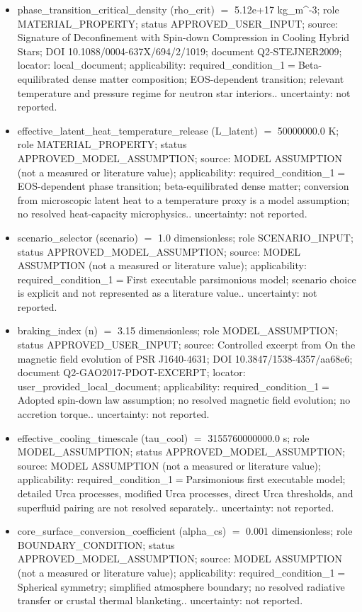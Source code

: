 \documentclass[11pt]{article}
\begin{document}
\begin{itemize}
\item phase\_transition\_critical\_density (rho\_crit) \ensuremath{=} 5.12e+17 kg\_m\textasciicircum{}-3; role MATERIAL\_PROPERTY; status APPROVED\_USER\_INPUT; source: Signature of Deconfinement with Spin-down Compression in Cooling Hybrid Stars; DOI 10.1088/0004-637X/694/2/1019; document Q2-STEJNER2009; locator: local\_document; applicability: required\_condition\_1\ensuremath{=}Beta-equilibrated dense matter composition; EOS-dependent transition; relevant temperature and pressure regime for neutron star interiors.. uncertainty: not reported.
\item effective\_latent\_heat\_temperature\_release (L\_latent) \ensuremath{=} 50000000.0 K; role MATERIAL\_PROPERTY; status APPROVED\_MODEL\_ASSUMPTION; source: MODEL ASSUMPTION (not a measured or literature value); applicability: required\_condition\_1\ensuremath{=}EOS-dependent phase transition; beta-equilibrated dense matter; conversion from microscopic latent heat to a temperature proxy is a model assumption; no resolved heat-capacity microphysics.. uncertainty: not reported.
\item scenario\_selector (scenario) \ensuremath{=} 1.0 dimensionless; role SCENARIO\_INPUT; status APPROVED\_MODEL\_ASSUMPTION; source: MODEL ASSUMPTION (not a measured or literature value); applicability: required\_condition\_1\ensuremath{=}First executable parsimonious model; scenario choice is explicit and not represented as a literature value.. uncertainty: not reported.
\item braking\_index (n) \ensuremath{=} 3.15 dimensionless; role MODEL\_ASSUMPTION; status APPROVED\_USER\_INPUT; source: Controlled excerpt from On the magnetic field evolution of PSR J1640-4631; DOI 10.3847/1538-4357/aa68e6; document Q2-GAO2017-PDOT-EXCERPT; locator: user\_provided\_local\_document; applicability: required\_condition\_1\ensuremath{=}Adopted spin-down law assumption; no resolved magnetic field evolution; no accretion torque.. uncertainty: not reported.
\item effective\_cooling\_timescale (tau\_cool) \ensuremath{=} 3155760000000.0 s; role MODEL\_ASSUMPTION; status APPROVED\_MODEL\_ASSUMPTION; source: MODEL ASSUMPTION (not a measured or literature value); applicability: required\_condition\_1\ensuremath{=}Parsimonious first executable model; detailed Urca processes, modified Urca processes, direct Urca thresholds, and superfluid pairing are not resolved separately.. uncertainty: not reported.
\item core\_surface\_conversion\_coefficient (alpha\_cs) \ensuremath{=} 0.001 dimensionless; role BOUNDARY\_CONDITION; status APPROVED\_MODEL\_ASSUMPTION; source: MODEL ASSUMPTION (not a measured or literature value); applicability: required\_condition\_1\ensuremath{=}Spherical symmetry; simplified atmosphere boundary; no resolved radiative transfer or crustal thermal blanketing.. uncertainty: not reported.

\end{itemize}
\end{document}
